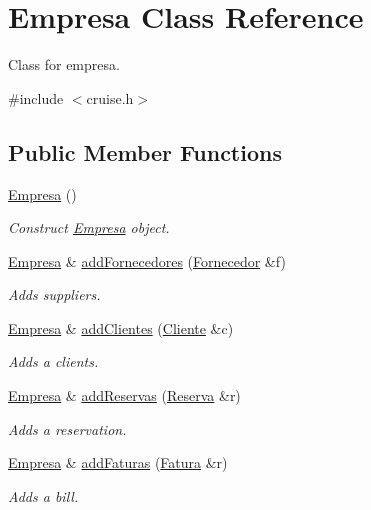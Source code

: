 \hypertarget{classEmpresa}{}\section{Empresa Class Reference}
\label{classEmpresa}


Class for empresa.  




{\ttfamily \#include $<$cruise.\+h$>$}

\subsection*{Public Member Functions}
\begin{DoxyCompactItemize}
\item 
\hyperlink{classEmpresa_aff124b958356c479ab50ddf4cf302193}{Empresa} ()
\begin{DoxyCompactList}\small\item\em Construct \hyperlink{classEmpresa}{Empresa} object. \end{DoxyCompactList}\item 
\hyperlink{classEmpresa}{Empresa} \& \hyperlink{classEmpresa_a0c858479d6e92094adbb2fc085039376}{add\+Fornecedores} (\hyperlink{classFornecedor}{Fornecedor} \&f)
\begin{DoxyCompactList}\small\item\em Adds suppliers. \end{DoxyCompactList}\item 
\hyperlink{classEmpresa}{Empresa} \& \hyperlink{classEmpresa_a57597ec4154f274686bc648ccf5d2a59}{add\+Clientes} (\hyperlink{classCliente}{Cliente} \&c)
\begin{DoxyCompactList}\small\item\em Adds a clients. \end{DoxyCompactList}\item 
\hyperlink{classEmpresa}{Empresa} \& \hyperlink{classEmpresa_a42a1671b234ab8380cfb2ed33517edb2}{add\+Reservas} (\hyperlink{classReserva}{Reserva} \&r)
\begin{DoxyCompactList}\small\item\em Adds a reservation. \end{DoxyCompactList}\item 
\hyperlink{classEmpresa}{Empresa} \& \hyperlink{classEmpresa_a89c034ba48b716dfe61724e38eb0afbb}{add\+Faturas} (\hyperlink{classFatura}{Fatura} \&r)
\begin{DoxyCompactList}\small\item\em Adds a bill. \end{DoxyCompactList}\item 

\end{DoxyCompactItemize}
